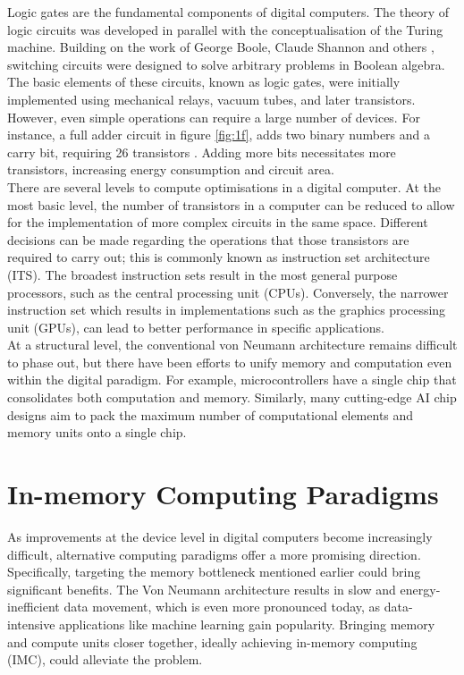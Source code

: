 \noindent Logic gates are the fundamental components of digital computers. The theory of logic circuits was developed in parallel with the conceptualisation of the Turing machine. Building on the work of George Boole, Claude Shannon and others \cite{shannon1938symbolic}, switching circuits were designed to solve arbitrary problems in Boolean algebra. The basic elements of these circuits, known as logic gates, were initially implemented using mechanical relays, vacuum tubes, and later transistors. However, even simple operations can require a large number of devices. For instance, a full adder circuit in figure \ref{fig:1f}, adds two binary numbers and a carry bit, requiring 26 transistors \cite{raghunandan2019design}. Adding more bits necessitates more transistors, increasing energy consumption and circuit area. \\

\noindent There are several levels to compute optimisations in a digital computer. At the most basic level, the number of transistors in a computer can be reduced to allow for the implementation of more complex circuits in the same space. Different decisions can be made regarding the operations that those transistors are required to carry out; this is commonly known as instruction set architecture (ITS). The broadest instruction sets result in the most general purpose processors, such as the central processing unit (CPUs). Conversely, the narrower instruction set which results in implementations such as the graphics processing unit (GPUs), can lead to better performance in specific applications. \\

\noindent At a structural level, the conventional von Neumann architecture remains difficult to phase out, but there have been efforts to unify memory and computation even within the digital paradigm. For example, microcontrollers have a single chip that consolidates both computation and memory. Similarly, many cutting-edge AI chip designs aim to pack the maximum number of computational elements and memory units onto a single chip. \\

\section[In-memory Computing Paradigms]{In-memory Computing Paradigms}

As improvements at the device level in digital computers become increasingly difficult, alternative computing paradigms offer a more promising direction. Specifically, targeting the memory bottleneck mentioned earlier could bring significant benefits. The Von Neumann architecture results in slow and energy-inefficient data movement, which is even more pronounced today, as data-intensive applications like machine learning gain popularity. Bringing memory and compute units closer together, ideally achieving in-memory computing (IMC), could alleviate the problem. \\

